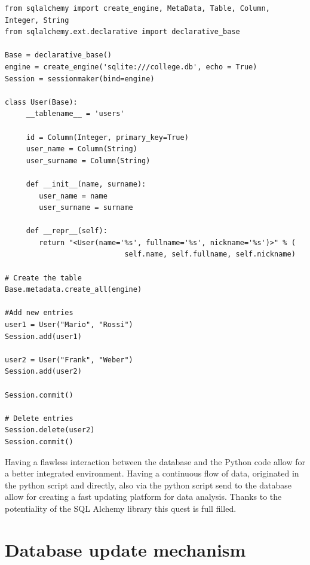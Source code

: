 \documentclass[../main.tex]{subfiles}
\begin{document}
\lstset{language=Python}
\lstset{frame=lines}
\lstset{basicstyle=\footnotesize}
\begin{lstlisting}
from sqlalchemy import create_engine, MetaData, Table, Column, 
Integer, String
from sqlalchemy.ext.declarative import declarative_base

Base = declarative_base()
engine = create_engine('sqlite:///college.db', echo = True)
Session = sessionmaker(bind=engine)

class User(Base):
     __tablename__ = 'users'

     id = Column(Integer, primary_key=True)
     user_name = Column(String)
     user_surname = Column(String)

     def __init__(name, surname):
        user_name = name
        user_surname = surname
        
     def __repr__(self):
        return "<User(name='%s', fullname='%s', nickname='%s')>" % (
                            self.name, self.fullname, self.nickname)
            
# Create the table
Base.metadata.create_all(engine)

#Add new entries
user1 = User("Mario", "Rossi")
Session.add(user1)

user2 = User("Frank", "Weber")
Session.add(user2)

Session.commit()

# Delete entries
Session.delete(user2)
Session.commit()
\end{lstlisting}
Having a flawless interaction between the database and the Python code allow for a better integrated environment. Having a continuous flow of data, originated in the python script and directly, also via the python script send to the database allow for creating a fast updating platform for data analysis. Thanks to the potentiality of the SQL Alchemy library this quest is full filled. 
\section{Database update mechanism}
\cleardoublepage
\end{document}
